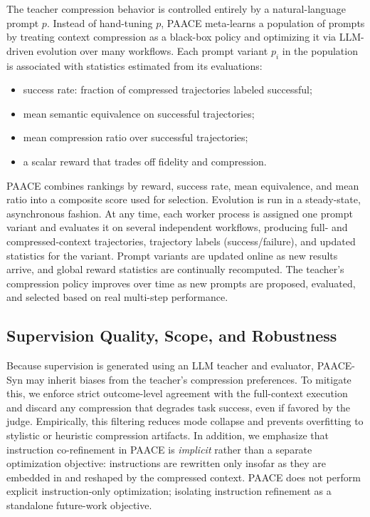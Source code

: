 \documentclass{article}
\theoremstyle{plain}
\theoremstyle{definition}
\theoremstyle{remark}
\begin{document}
The teacher compression behavior is controlled entirely by a natural-language prompt \(p\).
Instead of hand-tuning \(p\), PAACE meta-learns a population of prompts by treating context
compression as a black-box policy and optimizing it via LLM-driven evolution over many workflows. Each prompt variant \(p_i\) in the population is associated with statistics estimated from its
evaluations:

\begin{itemize}[topsep=0pt,itemsep=0pt,parsep=0pt,partopsep=0pt]
    \item success rate: fraction of compressed trajectories labeled successful;
    \item mean semantic equivalence on successful trajectories;
    \item mean compression ratio over successful trajectories;
    \item a scalar reward that trades off fidelity and compression.
\end{itemize}



PAACE combines rankings by reward, success rate, mean
equivalence, and mean ratio into a composite score used for selection. Evolution is run in a steady-state, asynchronous fashion.
At any time, each worker process is assigned one prompt variant and evaluates it on several
independent workflows, producing full- and compressed-context trajectories, trajectory labels (success/failure), and updated statistics for the variant. Prompt variants are updated online as new results arrive, and global reward statistics are continually recomputed. The teacher's compression policy improves over time as new prompts are proposed, evaluated,
and selected based on real multi-step performance.


\subsection{Supervision Quality, Scope, and Robustness}

Because supervision is generated using an LLM teacher and evaluator, PAACE-Syn may inherit
biases from the teacher’s compression preferences. To mitigate this, we enforce strict
outcome-level agreement with the full-context execution and discard any compression that
degrades task success, even if favored by the judge. Empirically, this filtering reduces mode
collapse and prevents overfitting to stylistic or heuristic compression artifacts. In addition, we emphasize that instruction co-refinement in PAACE is \emph{implicit} rather than a
separate optimization objective: instructions are rewritten only insofar as they are
embedded in and reshaped by the compressed context. PAACE does not perform explicit
instruction-only optimization; isolating instruction refinement as a standalone future-work objective. 
\end{document}
